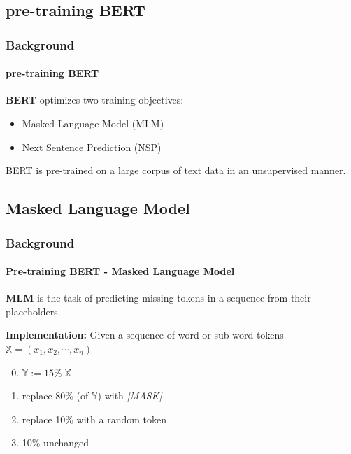 \documentclass[12pt]{beamer}
\begin{document}
	\subsection{pre-training BERT}
	\begin{frame}
		\frametitle{Background}
		\framesubtitle{pre-training BERT}
		
		{ \large
			\textbf{BERT} optimizes two training objectives:
			
			\begin{itemize}
				\item Masked Language Model (MLM)
				\item Next Sentence Prediction (NSP)
			\end{itemize}
		}
	
		{ \large
			\vspace*{.5cm} 
			BERT is pre-trained on a large corpus of text data in an unsupervised manner. 
		}
		
	\end{frame}
	
	\subsection{Masked Language Model}
	\begin{frame}
		\frametitle{Background}
		\framesubtitle{Pre-training BERT - Masked Language Model}
		
		{ \large
			\textbf{MLM} is the task of predicting missing tokens in a sequence from their placeholders.
		} \newline
		
		\textbf{Implementation:} Given a sequence of word or sub-word tokens $\mathbb{X} = (x_1, x_2, \cdots, x_n)$
		\begin{enumerate}
			\setcounter{enumi}{-1}
			\item $\mathbb{Y}:= 15\% \; \mathbb{X}$
			\item replace 80\% (of $\mathbb{Y}$) with \textit{[MASK]}
			\item replace 10\% with a random token
			\item 10\% unchanged
		\end{enumerate}
		
	\end{frame}
	
\end{document}
